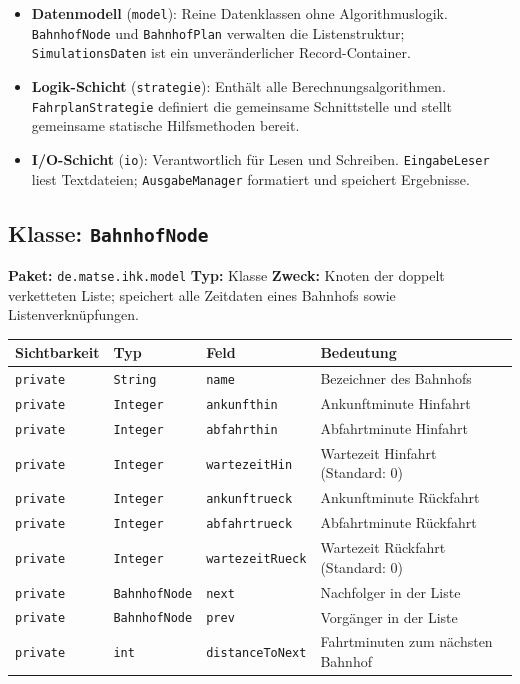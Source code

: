 \documentclass[12pt,a4paper]{article}
\begin{document}
\begin{itemize}
  \item \textbf{Datenmodell} (\texttt{model}): Reine Datenklassen ohne Algorithmuslogik.
        \texttt{BahnhofNode} und \texttt{BahnhofPlan} verwalten die Listenstruktur;
        \texttt{SimulationsDaten} ist ein unveränderlicher Record-Container.
  \item \textbf{Logik-Schicht} (\texttt{strategie}): Enthält alle Berechnungsalgorithmen.
        \texttt{FahrplanStrategie} definiert die gemeinsame Schnittstelle und stellt
        gemeinsame statische Hilfsmethoden bereit.
  \item \textbf{I/O-Schicht} (\texttt{io}): Verantwortlich für Lesen und Schreiben.
        \texttt{EingabeLeser} liest Textdateien; \texttt{AusgabeManager} formatiert
        und speichert Ergebnisse.
\end{itemize}

\subsection{Klasse: \texttt{BahnhofNode}}

\textbf{Paket:} \texttt{de.matse.ihk.model} \quad
\textbf{Typ:} Klasse \quad
\textbf{Zweck:} Knoten der doppelt verketteten Liste; speichert alle Zeitdaten
eines Bahnhofs sowie Listenverknüpfungen.

\begin{center}
\small
\begin{tabular}{lllp{5.5cm}}
\toprule
\textbf{Sichtbarkeit} & \textbf{Typ} & \textbf{Feld} & \textbf{Bedeutung} \\
\midrule
\texttt{private} & \texttt{String}      & \texttt{name}           & Bezeichner des Bahnhofs \\
\texttt{private} & \texttt{Integer}     & \texttt{ankunfthin}     & Ankunftminute Hinfahrt \\
\texttt{private} & \texttt{Integer}     & \texttt{abfahrthin}     & Abfahrtminute Hinfahrt \\
\texttt{private} & \texttt{Integer}     & \texttt{wartezeitHin}   & Wartezeit Hinfahrt (Standard: 0) \\
\texttt{private} & \texttt{Integer}     & \texttt{ankunftrueck}   & Ankunftminute Rückfahrt \\
\texttt{private} & \texttt{Integer}     & \texttt{abfahrtrueck}   & Abfahrtminute Rückfahrt \\
\texttt{private} & \texttt{Integer}     & \texttt{wartezeitRueck} & Wartezeit Rückfahrt (Standard: 0) \\
\texttt{private} & \texttt{BahnhofNode} & \texttt{next}           & Nachfolger in der Liste \\
\texttt{private} & \texttt{BahnhofNode} & \texttt{prev}           & Vorgänger in der Liste \\
\texttt{private} & \texttt{int}         & \texttt{distanceToNext} & Fahrtminuten zum nächsten Bahnhof \\
\bottomrule
\end{tabular}
\end{center}
\end{document}
